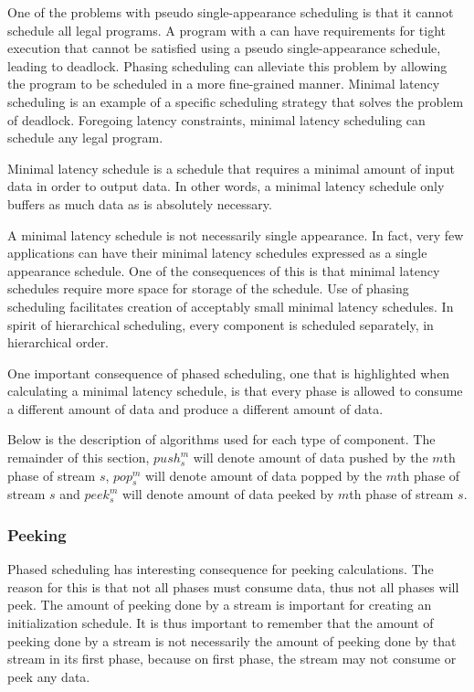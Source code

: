 One of the problems with pseudo single-appearance scheduling is
that it cannot schedule all legal {\StreamIt} programs.  A program
with a {\feedbackloop} can have requirements for tight execution
that cannot be satisfied using a pseudo single-appearance
schedule, leading to deadlock. Phasing scheduling can alleviate
this problem by allowing the program to be scheduled in a more
fine-grained manner. Minimal latency scheduling is an example of a
specific scheduling strategy that solves the problem of deadlock.
Foregoing latency constraints, minimal latency scheduling can
schedule any legal {\StreamIt} program.

Minimal latency schedule is a schedule that requires a minimal
amount of input data in order to output data. In other words, a
minimal latency schedule only buffers as much data as is
absolutely necessary.

A minimal latency schedule is not necessarily single appearance.
In fact, very few applications can have their minimal latency
schedules expressed as a single appearance schedule.  One of the
consequences of this is that minimal latency schedules require
more space for storage of the schedule. Use of phasing scheduling
facilitates creation of acceptably small minimal latency
schedules.  In spirit of hierarchical scheduling, every component
is scheduled separately, in hierarchical order.

One important consequence of phased scheduling, one that is
highlighted when calculating a minimal latency schedule, is that
every phase is allowed to consume a different amount of data and
produce a different amount of data.

Below is the description of algorithms used for each type of
{\StreamIt} component. The remainder of this section, $push^m_s$
will denote amount of data pushed by the $m$th phase of stream
$s$, $pop^m_s$ will denote amount of data popped by the $m$th
phase of stream $s$ and $peek^m_s$ will denote amount of data
peeked by $m$th phase of stream $s$.

\subsubsection{Peeking}

Phased scheduling has interesting consequence for peeking
calculations.  The reason for this is that not all phases must
consume data, thus not all phases will peek.  The amount of
peeking done by a stream is important for creating an
initialization schedule.  It is thus important to remember that
the amount of peeking done by a stream is not necessarily the
amount of peeking done by that stream in its first phase, because
on first phase, the stream may not consume or peek any data.

